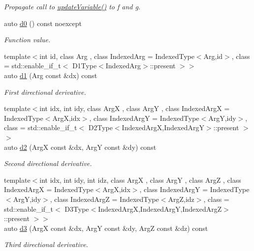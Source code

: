 \begin{DoxyCompactItemize}
\begin{DoxyCompactList}\small\item\em Propagate call to \hyperlink{structFunG_1_1MathematicalOperations_1_1Product_a099d1b61893364d6536925d32c00ad31}{update\-Variable()} to f and g. \end{DoxyCompactList}\item 
\hypertarget{structFunG_1_1MathematicalOperations_1_1Product_ad0c816f33a344bc7ca816dbaad9c78f8}{auto \hyperlink{structFunG_1_1MathematicalOperations_1_1Product_ad0c816f33a344bc7ca816dbaad9c78f8}{d0} () const noexcept}\label{structFunG_1_1MathematicalOperations_1_1Product_ad0c816f33a344bc7ca816dbaad9c78f8}

\begin{DoxyCompactList}\small\item\em Function value. \end{DoxyCompactList}\item 
{\footnotesize template$<$int id, class Arg , class Indexed\-Arg  = Indexed\-Type$<$\-Arg,id$>$, class  = std\-::enable\-\_\-if\-\_\-t$<$ D1\-Type$<$\-Indexed\-Arg$>$\-::present $>$$>$ }\\auto \hyperlink{structFunG_1_1MathematicalOperations_1_1Product_aea69feaac16f79717a85d7b089a80f8f}{d1} (Arg const \&dx) const 
\begin{DoxyCompactList}\small\item\em First directional derivative. \end{DoxyCompactList}\item 
{\footnotesize template$<$int idx, int idy, class Arg\-X , class Arg\-Y , class Indexed\-Arg\-X  = Indexed\-Type$<$\-Arg\-X,idx$>$, class Indexed\-Arg\-Y  = Indexed\-Type$<$\-Arg\-Y,idy$>$, class  = std\-::enable\-\_\-if\-\_\-t$<$ D2\-Type$<$\-Indexed\-Arg\-X,\-Indexed\-Arg\-Y$>$\-::present $>$$>$ }\\auto \hyperlink{structFunG_1_1MathematicalOperations_1_1Product_a91802ff95963324b5f36016ac5f8c5e0}{d2} (Arg\-X const \&dx, Arg\-Y const \&dy) const 
\begin{DoxyCompactList}\small\item\em Second directional derivative. \end{DoxyCompactList}\item 
{\footnotesize template$<$int idx, int idy, int idz, class Arg\-X , class Arg\-Y , class Arg\-Z , class Indexed\-Arg\-X  = Indexed\-Type$<$\-Arg\-X,idx$>$, class Indexed\-Arg\-Y  = Indexed\-Type$<$\-Arg\-Y,idy$>$, class Indexed\-Arg\-Z  = Indexed\-Type$<$\-Arg\-Z,idz$>$, class  = std\-::enable\-\_\-if\-\_\-t$<$ D3\-Type$<$\-Indexed\-Arg\-X,\-Indexed\-Arg\-Y,\-Indexed\-Arg\-Z$>$\-::present $>$$>$ }\\auto \hyperlink{structFunG_1_1MathematicalOperations_1_1Product_a1ba58e174ea3864a63a4158b95fc8db0}{d3} (Arg\-X const \&dx, Arg\-Y const \&dy, Arg\-Z const \&dz) const 
\begin{DoxyCompactList}\small\item\em Third directional derivative. \end{DoxyCompactList}\end{DoxyCompactItemize}


